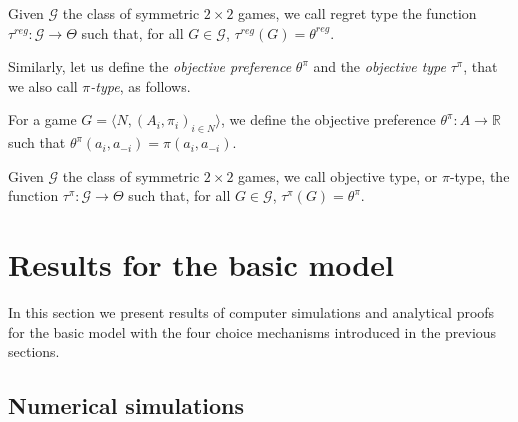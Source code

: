 \documentclass[fleqn,reqno,11pt]{article}
\begin{document}
\begin{definition} \label{defn:regtype}

Given $ \mathcal{G} $ the class of symmetric $ 2 \times 2 $ games, we call regret type the function $\tau^{reg}: \mathcal{G} \rightarrow  \Theta$ such that, for all $G \in \mathcal{G}$, $ \tau^{reg}(G)= \theta^{reg}$.

\end{definition}

\noindent Similarly, let us define the \textit{objective preference} $\theta^{\pi}$ and the \textit{objective type} $ \tau^{\pi} $, that we also call $\pi$\textit{-type}, as follows. 

\begin{definition} \label{defn:objpref}

For a game $ G=\langle N, (A_i , \pi_i)_{i \in N} \rangle $, we define the objective preference $ \theta^{\pi}: A \rightarrow \mathbb{R} $ such that $ \theta^{\pi}(a_i,a_{-i})=\pi(a_i,a_{-i}) $.

\end{definition}


\begin{definition} \label{defn:objtype}

Given $ \mathcal{G} $ the class of symmetric $ 2 \times 2 $ games, we call objective type, or $\pi$-type, the function $\tau^{\pi}: \mathcal{G} \rightarrow  \Theta$ such that, for all $G \in \mathcal{G}$, $ \tau^{\pi}(G)= \theta^{\pi}$.

\end{definition}

\fi


\section{Results for the basic model}
\label{sec:results:-basic-model}


In this section we present results of computer simulations and analytical proofs for the basic
model with the four choice mechanisms introduced in the previous sections. 

\subsection{Numerical simulations}
\label{sec:numer-simul}
\end{document}
